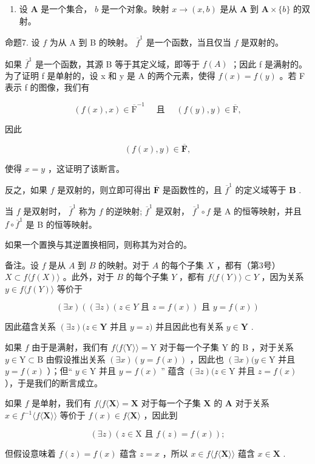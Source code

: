 \begin{enumerate}
\def\labelenumi{(\arabic{enumi})}
\setcounter{enumi}{4}
\tightlist
\item
  设 \(\mathbf{A}\) 是一个集合， \(b\) 是一个对象。映射 \(x \to (x, b)\) 是从 \(\mathbf{A}\) 到 \(\mathbf{A} \times \{b\}\) 的双射。
\end{enumerate}

命题7. 设 \(f\) 为从 A 到 B 的映射。 \(\overline{f}^1\) 是一个函数，当且仅当 \(f\) 是双射的。

如果 \(\overline{f}^{1}\) 是一个函数，其源 B 等于其定义域，即等于 \(f(A)\) ；因此 f 是满射的。为了证明 f 是单射的，设 x 和 y 是 A 的两个元素，使得 \(f(x)=f(y)\) 。若 F 表示 f 的图像，我们有

\[
(f (x), x) \in \overline {{\mathrm{F}}} ^ {- 1} \quad \text { 且 } \quad (f (y), y) \in \overline {{\mathrm{F}}},
\]

因此

\[
(f (x), y) \in \overline {{\mathbf {F}}},
\]

使得 \(x = y\) ，这证明了该断言。

反之，如果 \(f\) 是双射的，则立即可得出 \(\overline{\mathbf{F}}\) 是函数性的，且 \(\overline{f}^1\) 的定义域等于 \(\mathbf{B}\) .

当 \(f\) 是双射时， \(\overline{f}^1\) 称为 \(f\) 的逆映射; \(\overline{f}^1\) 是双射， \(\overline{f}^1 \circ f\) 是 A 的恒等映射，并且 \(f \circ \overline{f}^1\) 是 B 的恒等映射。

如果一个置换与其逆置换相同，则称其为对合的。

备注。设 \(f\) 是从 \(A\) 到 \(B\) 的映射。对于 \(A\) 的每个子集 \(X\) ，都有（第3号） \(X \subset f\langle f(X)\rangle\) 。此外，对于 \(B\) 的每个子集 \(Y\) ，都有 \(f\langle f(Y)\rangle \subset Y\) ，因为关系 \(y \in f\langle f(Y)\rangle\) 等价于

\[
(\exists x) ((\exists z) (z \in Y \text { 且 } z = f (x)) \text { 且 } y = f (x))
\]

因此蕴含关系 \((\exists z)(z \in \mathbf{Y}\) 并且 \(y = z)\) 并且因此也有关系 \(y \in \mathbf{Y}\) .

如果 \(f\) 由于是满射，我们有 \(f\langle f\langle \mathrm{Y}\rangle\rangle = \mathrm{Y}\) 对于每一个子集 \(\mathrm{Y}\) 的 \(\mathrm{B}\) ，对于关系 \(y\in \mathrm{Y}\subset \mathrm{B}\) 由假设推出关系 \((\exists x)(y = f(x))\) ，因此也 \((\exists x)(y\in \mathrm{Y}\) 并且 \(y = f(x)\) ）；但“ \(y\in \mathrm{Y}\) 并且 \(y = f(x)\) '' 蕴含 \((\exists z)(z\in \mathrm{Y}\) 并且 \(z = f(x)\) ），于是我们的断言成立。

如果 \(f\) 是单射，我们有 \(f\langle f\langle \mathbf{X}\rangle = \mathbf{X}\) 对于每一个子集 \(\mathbf{X}\) 的 \(\mathbf{A}\) 对于关系 \(x\in f^{-1}\langle f\langle \mathbf{X}\rangle\rangle\) 等价于 \(f(x)\in f\langle \mathbf{X}\rangle\) ，因此到

\[
(\exists z) (z \in \mathrm{X} \text {   且   } f (z) = f (x));
\]

但假设意味着 \(f(z) = f(x)\) 蕴含 \(z = x\) ，所以 \(x \in f\langle f\langle \mathbf{X}\rangle \rangle\) 蕴含 \(x \in \mathbf{X}\) .

